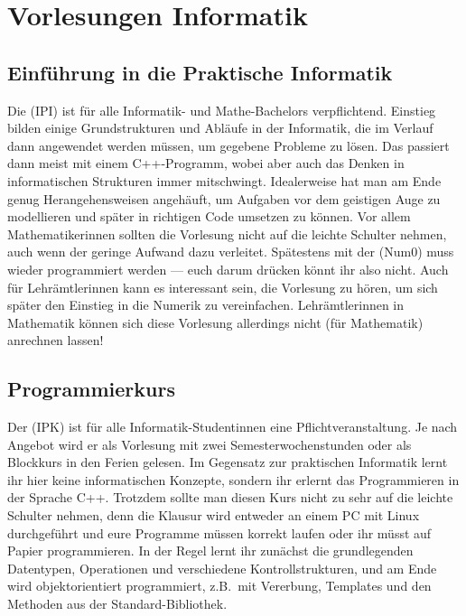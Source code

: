 \section*{Vorlesungen Informatik}

\subsection{Einführung in die Praktische Informatik}
\label{info1}
Die  (\gls{IPI}) ist für alle Informatik- und Mathe-Bachelors verpflichtend. Einstieg bilden einige Grundstrukturen und Abläufe in der Informatik, die im Verlauf dann angewendet werden müssen, um gegebene Probleme zu lösen. Das passiert dann meist mit einem C++-Programm, wobei aber auch das Denken in informatischen Strukturen immer mitschwingt. Idealerweise hat man am Ende genug Herangehensweisen angehäuft, um Aufgaben vor dem geistigen Auge zu modellieren und später in richtigen Code umsetzen zu können. Vor allem Mathematikerinnen sollten die Vorlesung nicht auf die leichte Schulter nehmen, auch wenn der geringe Aufwand dazu verleitet. Spätestens mit der  (\gls{Num0}) muss wieder programmiert werden --- euch darum drücken könnt ihr also nicht. Auch für Lehrämtlerinnen kann es interessant sein, die Vorlesung zu hören, um sich später den Einstieg in die Numerik zu vereinfachen. Lehrämtlerinnen in Mathematik können sich diese Vorlesung allerdings nicht (für Mathematik) anrechnen lassen!

\subsection{Programmierkurs}
\label{ipk}
Der  (\gls{IPK}) ist für alle Informatik-Studentinnen eine Pflichtveranstaltung. Je nach Angebot wird er als Vorlesung mit zwei Semesterwochenstunden oder als Blockkurs in den Ferien gelesen. Im Gegensatz zur praktischen Informatik lernt ihr hier keine informatischen Konzepte, sondern ihr erlernt das Programmieren in der Sprache C++. Trotzdem sollte man diesen Kurs nicht zu sehr auf die leichte Schulter nehmen, denn die Klausur wird entweder an einem PC mit Linux durchgeführt und eure Programme müssen korrekt laufen oder ihr müsst auf Papier programmieren. In der Regel lernt ihr zunächst die grundlegenden Datentypen, Operationen und verschiedene Kontrollstrukturen, und am Ende wird objektorientiert programmiert, z.B.~mit Vererbung, Templates und den Methoden aus der Standard-Bibliothek.

